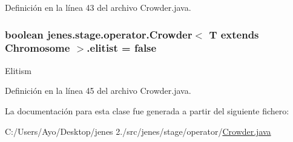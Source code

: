 Definición en la línea 43 del archivo Crowder.\-java.

\hypertarget{classjenes_1_1stage_1_1operator_1_1_crowder_3_01_t_01extends_01_chromosome_01_4_a5337bdf3f7d5ad8d6e09daaa3bb0636b}{
\subsubsection[{elitist}]{\setlength{\rightskip}{0pt plus 5cm}boolean jenes.\-stage.\-operator.\-Crowder$<$ T extends Chromosome $>$.elitist = false\hspace{0.3cm}{\ttfamily [protected]}}}\label{classjenes_1_1stage_1_1operator_1_1_crowder_3_01_t_01extends_01_chromosome_01_4_a5337bdf3f7d5ad8d6e09daaa3bb0636b}
Elitism 

Definición en la línea 45 del archivo Crowder.\-java.



La documentación para esta clase fue generada a partir del siguiente fichero\-:\begin{DoxyCompactItemize}
\item 
C\-:/\-Users/\-Ayo/\-Desktop/jenes 2./src/jenes/stage/operator/\hyperlink{_crowder_8java}{Crowder.\-java}\end{DoxyCompactItemize}
